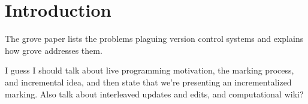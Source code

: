 
\section{Introduction}%
\label{sec:Introduction}

The grove paper lists the problems plaguing version control systems and explains how grove addresses them. 

I guess I should talk about live programming motivation, the marking process, and incremental idea, and then state that we're presenting an incrementalized marking. Also talk about interleaved updates and edits, and computational wiki?

